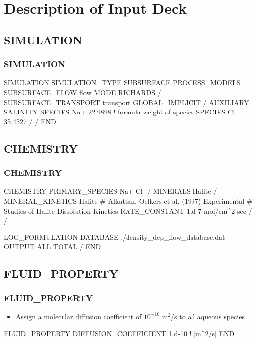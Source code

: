 \documentclass{beamer}
\newcommand\bluecomment[1]{{{\color{blue} #1}}}
\newcommand\magentacomment[1]{{{\color{magenta} #1}}}
\begin{document}
\section{Description of Input Deck}

\subsection{SIMULATION}
\begin{frame}\frametitle{SIMULATION}

\begin{semiverbatim}
SIMULATION
  SIMULATION_TYPE SUBSURFACE
  PROCESS_MODELS
    SUBSURFACE_FLOW flow
      MODE RICHARDS
    /
    SUBSURFACE_TRANSPORT transport
      GLOBAL_IMPLICIT
    /
    \magentacomment{AUXILIARY SALINITY
      SPECIES Na+ 22.9898    \bluecomment{! formula weight of species}
      SPECIES Cl- 35.4527
    /}
  /
END
\end{semiverbatim}

\end{frame}

\subsection{CHEMISTRY}

\begin{frame}\frametitle{CHEMISTRY}
\begin{semiverbatim}
CHEMISTRY
  PRIMARY_SPECIES
    Na+
    Cl-
  /
  MINERALS
    Halite
  /
  MINERAL_KINETICS
    Halite
      \bluecomment{# Alkattan, Oelkers et al. (1997) Experimental
      #  Studies of Halite Dissolution Kinetics}
      RATE_CONSTANT 1.d-7 mol/cm^2-sec 
    /
  /
  
  LOG_FORMULATION
  DATABASE ./density_dep_flow_database.dat
  OUTPUT
    ALL
    TOTAL
  /
END
\end{semiverbatim}

\end{frame}

\subsection{FLUID\_PROPERTY}

\begin{frame}\frametitle{FLUID\_PROPERTY}

\begin{itemize}
  \item Assign a molecular diffusion coefficient of $10^{-10}$ m$^2$/s to all aqueous species
\end{itemize}

\begin{semiverbatim}
  
FLUID_PROPERTY
  DIFFUSION_COEFFICIENT 1.d-10   \bluecomment{! [m^2/s]}
END
\end{semiverbatim}

\end{frame}
\end{document}
